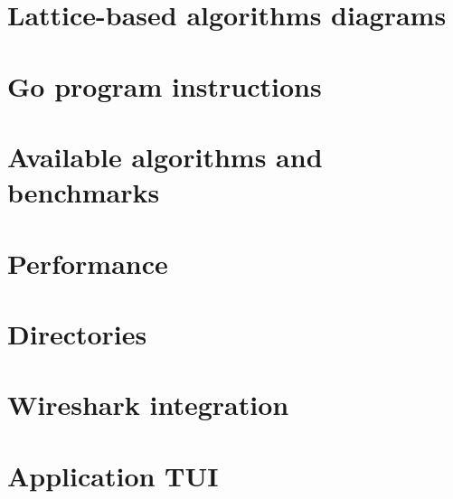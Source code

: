\chapter{Lattice-based algorithms diagrams}
\label{ch:block_diagrams}


\chapter{Go program instructions}
\label{ch:go_instructions}


\chapter{Available algorithms and benchmarks}
\label{ch:available_algs}


\chapter{Performance}
\label{ch:performance}


\chapter{Directories}
\label{ch:directories_app}


\chapter{Wireshark integration}
\label{ch:wireshark}


\chapter{Application TUI}
\label{ch:TUI_example}

